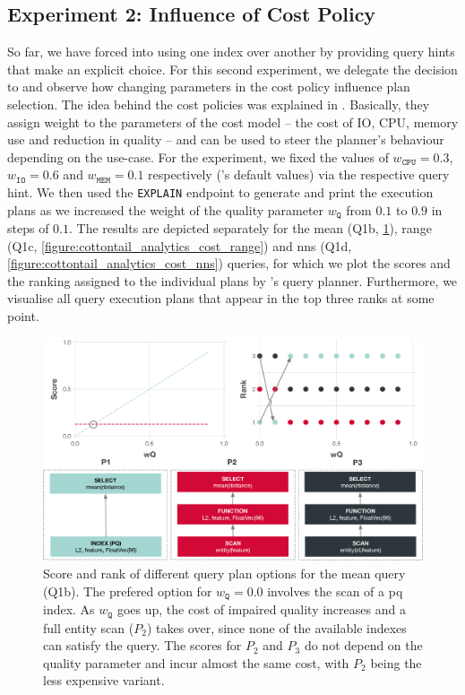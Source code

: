 \subsection{Experiment 2: Influence of Cost Policy}
\label{section:cost_model_evaluation}

So far, we have forced \cottontail{} into using one index over another by providing query hints that make an explicit choice. For this second experiment, we delegate the decision to \cottontail{} and observe how changing parameters in the cost policy influence plan selection. The idea behind the cost policies was explained in . Basically, they assign weight to the parameters of the cost model -- the cost of IO, CPU, memory use and reduction in quality -- and can be used to steer the planner's behaviour depending on the use-case. For the experiment, we fixed the values of $w_{\mathtt{CPU}} = 0.3$, $w_{\mathtt{IO}} = 0.6$ and $ w_{\mathtt{MEM}} = 0.1$ respectively (\cottontail{}'s default values) via the respective query hint. We then used the \texttt{EXPLAIN} endpoint to generate and print the execution plans as we increased the weight of the quality parameter $w_{\mathtt{Q}}$ from $0.1$ to $0.9$ in steps of $0.1$. The results are depicted separately for the mean (Q1b, \ref{figure:cottontail_analytics_cost_mean}), range (Q1c, \ref{figure:cottontail_analytics_cost_range}) and \acrshort{nns} (Q1d, \ref{figure:cottontail_analytics_cost_nns}) queries, for which we plot the scores and the ranking assigned to the individual plans by \cottontail{}'s query planner. Furthermore, we visualise all query execution plans that appear in the top three ranks at some point.

\begin{figure}[tb]
    \centering
    \includegraphics[width=\textwidth]{figures/analytics/analytics-cottontail-cost-mean-annotated}
    \caption{Score and rank of different query plan options for the mean query (Q1b). The prefered option for $w_{\texttt{Q}} = 0.0$ involves the scan of a \acrshort{pq} index. As $w_{\texttt{Q}}$ goes up, the cost of impaired quality increases and a full entity scan ($P_2$) takes over, since none of the available indexes can satisfy the query. The scores for $P_2$ and $P_3$ do not depend on the quality parameter and incur almost the same cost, with $P_2$ being the less expensive variant.}
    \label{figure:cottontail_analytics_cost_mean}
\end{figure}

